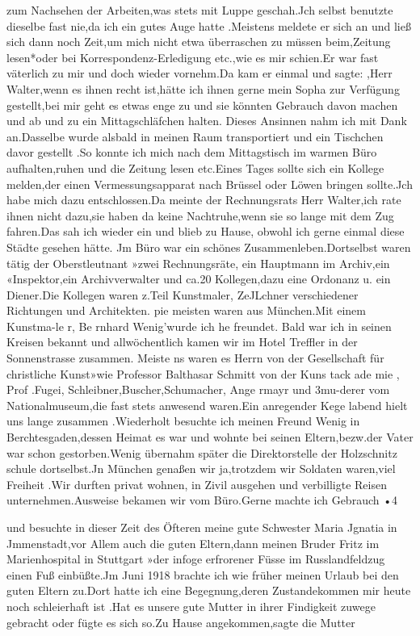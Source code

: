 \documentclass[a4paper,11pt]{article}
\begin{document}
zum Nachsehen der Arbeiten,was stets mit Luppe geschah.Jch selbst benutzte dieselbe fast nie,da ich ein gutes Auge hatte .Meistens meldete er sich an und ließ sich dann noch Zeit,um mich nicht etwa überraschen zu müssen beim,Zeitung lesen*oder bei Korrespondenz-Erledigung etc.,wie es mir schien.Er war fast väterlich zu mir und doch wieder vornehm.Da kam er einmal und sagte: ,Herr Walter,wenn es ihnen recht ist,hätte ich ihnen gerne mein Sopha zur Verfügung gestellt,bei mir geht es etwas enge zu und sie könnten Gebrauch davon machen und ab und zu ein Mittagschläfchen halten. Dieses Ansinnen nahm ich mit Dank an.Dasselbe wurde alsbald in meinen Raum transportiert und ein Tischchen davor gestellt .So konnte ich mich nach dem Mittagstisch im warmen Büro aufhalten,ruhen und die Zeitung lesen etc.Eines Tages sollte sich ein Kollege melden,der einen Vermessungsapparat nach Brüssel oder Löwen bringen sollte.Jch habe mich dazu entschlossen.Da meinte der Rechnungsrats Herr Walter,ich rate ihnen nicht dazu,sie haben da keine Nachtruhe,wenn sie so lange mit dem Zug fahren.Das sah ich wieder ein und blieb zu Hause, obwohl ich gerne einmal diese Städte gesehen hätte. Jm Büro war ein schönes Zusammenleben.Dortselbst waren tätig der Oberstleutnant »zwei Rechnungsräte, ein Hauptmann im Archiv,ein «Inspektor,ein Archivverwalter und ca.20 Kollegen,dazu eine Ordonanz u. ein Diener.Die Kollegen waren z.Teil Kunstmaler, ZeJLchner verschiedener Richtungen und Architekten. pie meisten waren aus München.Mit einem Kunstma-le r, Be rnhard Wenig’wurde ich he freundet. Bald war ich in seinen Kreisen bekannt und allwöchentlich kamen wir im Hotel Treffler in der Sonnenstrasse zusammen. Meiste ns waren es Herrn von der Gesellschaft für christliche Kunst»wie Professor Balthasar Schmitt von der Kuns tack ade mie , Prof .Fugei, Schleibner,Buscher,Schumacher, Ange rmayr und 3mu-derer vom Nationalmuseum,die fast stets anwesend waren.Ein anregender Kege labend hielt uns lange zusammen .Wiederholt besuchte ich meinen Freund Wenig in Berchtesgaden,dessen Heimat es war und wohnte bei seinen Eltern,bezw.der Vater war schon gestorben.Wenig übernahm später die Direktorstelle der Holzschnitz schule dortselbst.Jn München genaßen wir ja,trotzdem wir Soldaten waren,viel Freiheit .Wir durften privat wohnen, in Zivil ausgehen und verbilligte Reisen unternehmen.Ausweise bekamen wir vom Büro.Gerne machte ich Gebrauch •4

 und besuchte in dieser Zeit des Öfteren meine gute Schwester Maria Jgnatia in Jmmenstadt,vor Allem auch die guten Eltern,dann meinen Bruder Fritz im Marienhospital in Stuttgart »der infoge erfrorener Füsse im Russlandfeldzug einen Fuß einbüßte.Jm Juni 1918 brachte ich wie früher meinen Urlaub bei den guten Eltern zu.Dort hatte ich eine Begegnung,deren Zustandekommen mir heute noch schleierhaft ist .Hat es unsere gute Mutter in ihrer Findigkeit zuwege gebracht oder fügte es sich so.Zu Hause angekommen,sagte die Mutter
\end{document}
